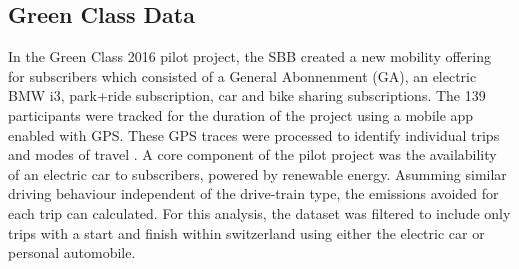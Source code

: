 
\subsection{Green Class Data}
In the Green Class 2016 pilot project, the SBB created a new mobility offering for subscribers which consisted of a General Abonnenment (GA), an electric BMW i3, park+ride subscription, car and bike sharing subscriptions.
The 139 participants were tracked for the duration of the project using a mobile app enabled with GPS.
 These GPS traces were processed to identify individual trips and modes of travel \cite{rabaul2016greenclassprocessing}.
A core component of the pilot project was the availability of an electric car to subscribers, powered by renewable energy.
Asumming similar driving behaviour independent of the drive-train type, the emissions avoided for each trip can calculated.
For this analysis, the dataset was filtered to include only trips with a start and finish within switzerland using either the electric car or personal automobile. 
